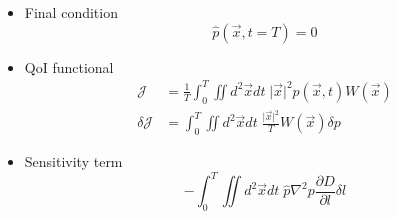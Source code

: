 \documentclass[11pt]{article}
\def\Dpartial#1#2{ \frac{\partial #1}{\partial #2} }
\newcommand{\vx}{\vec{x}}
\newcommand{\cJ}{\mathcal{J}}
\begin{document}
\begin{itemize}
\item Final condition
\begin{equation*}
\hat{p}(\vx,t=T) = 0
\end{equation*}
\item QoI functional
\begin{equation*}
\begin{split}
\cJ &= \frac{1}{T}\int_0^T\iint d^2\vx dt\; \vert \vx \vert^2 p(\vx,t)W(\vx) \\
\delta \cJ &= \int_0^T\iint d^2\vx dt\; \frac{\vert \vx \vert^2}{T}W(\vx)\delta p
\end{split}
\end{equation*}
\item Sensitivity term
\begin{equation*}
-\int_0^T\iint d^2\vx dt\; \hat{p}\nabla^2 p\Dpartial{D}{l}\delta l
\end{equation*}
\end{itemize}
\end{document}
